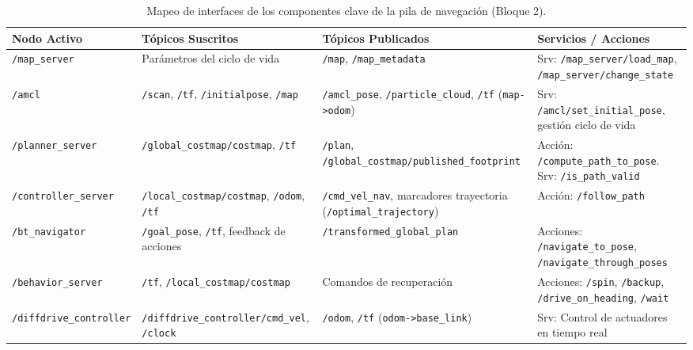 \documentclass[11pt,a4paper]{article}
\begin{document}
\begin{table}[htbp]
    \centering
    \footnotesize
    \begin{tabularx}{\textwidth}{>{\raggedright\arraybackslash}p{3.1cm} >{\raggedright\arraybackslash}p{3.5cm} >{\raggedright\arraybackslash}p{3.6cm} >{\raggedright\arraybackslash}X}
        \toprule
        \textbf{Nodo Activo} & \textbf{Tópicos Suscritos} & \textbf{Tópicos Publicados} & \textbf{Servicios / Acciones} \\
        \midrule
        \texttt{/map\_server} & Parámetros del ciclo de vida & \texttt{/map}, \texttt{/map\_metadata} & Srv: \texttt{/map\_server/load\_map}, \texttt{/map\_server/change\_state} \\
        \addlinespace
        \texttt{/amcl} & \texttt{/scan}, \texttt{/tf}, \texttt{/initialpose}, \texttt{/map} & \texttt{/amcl\_pose}, \texttt{/particle\_cloud}, \texttt{/tf} (\texttt{map->odom}) & Srv: \texttt{/amcl/set\_initial\_pose}, gestión ciclo de vida \\
        \addlinespace
        \texttt{/planner\_server} & \texttt{/global\_costmap/}\allowbreak\texttt{costmap}, \texttt{/tf} & \texttt{/plan}, \texttt{/global\_costmap/}\allowbreak\texttt{published\_footprint} & Acción: \texttt{/compute\_path\_to\_pose}. \newline Srv: \texttt{/is\_path\_valid} \\
        \addlinespace
        \texttt{/controller\_}\allowbreak\texttt{server} & \texttt{/local\_costmap/}\allowbreak\texttt{costmap}, \texttt{/odom}, \texttt{/tf} & \texttt{/cmd\_vel\_nav}, marcadores trayectoria (\texttt{/optimal\_trajectory}) & Acción: \texttt{/follow\_path} \\
        \addlinespace
        \texttt{/bt\_navigator} & \texttt{/goal\_pose}, \texttt{/tf}, feedback de acciones & \texttt{/transformed\_}\allowbreak\texttt{global\_plan} & Acciones: \texttt{/navigate\_to\_pose}, \texttt{/navigate\_through\_poses} \\
        \addlinespace
        \texttt{/behavior\_server} & \texttt{/tf}, \texttt{/local\_costmap/}\allowbreak\texttt{costmap} & Comandos de recuperación & Acciones: \texttt{/spin}, \texttt{/backup}, \texttt{/drive\_on\_heading}, \texttt{/wait} \\
        \addlinespace
        \texttt{/diffdrive\_}\allowbreak\texttt{controller} & \texttt{/diffdrive\_}\allowbreak\texttt{controller/}\allowbreak\texttt{cmd\_vel}, \texttt{/clock} & \texttt{/odom}, \texttt{/tf} (\texttt{odom->base\_link}) & Srv: Control de actuadores en tiempo real \\
        \bottomrule
    \end{tabularx}
    \caption{Mapeo de interfaces de los componentes clave de la pila de navegación (Bloque 2).}
    \label{tab:mapeo_interfaces_nav2}
\end{table}
\end{document}
